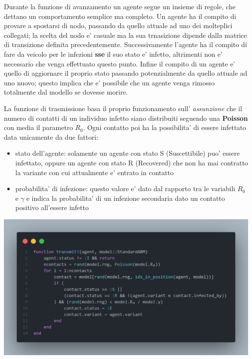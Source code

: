 Durante la funzione di avanzamento un agente segue un insieme di regole, che dettano
un comportamento semplice ma completo. Un agente ha il compito di provare a spostarsi di 
nodo, passando da quello attuale ad uno dei molteplici collegati; la scelta del nodo e' 
casuale ma la sua trnasizione dipende dalla matrice di transizione definita precedentemente.
Successivamente l'agente ha il compito di fare da veicolo per le infezioni \textbf{sse} 
il suo stato e' infetto, altrimenti non e' necessario che venga effettuato questo punto.
Infine il compito di un agente e' quello di aggiornare il proprio stato passando potenzialmente
da quello attuale ad uno nuovo; questo implica che e' possibile che un agente venga rimosso 
totalmente dal modello se dovesse morire.

La funzione di trasmissione basa il proprio funzionamento sull' \emph{assunzione} che il 
numero di contatti di un individuo infetto siano distribuiti seguendo
una \textbf{Poisson} con media il parametro $R_0$. Ogni contatto poi ha la possibilita'
di essere infettato data unicamente da due fattori:
\begin{itemize}
	\item stato dell'agente: solamente un agente con stato S (Suscettibile) puo' essere
	infettato, oppure un agente con stato R (Recovered) che non ha mai contratto la variante
	con cui attualmente e' entrato in contatto
	\item probabilita' di infezione: questo valore e' dato dal rapporto tra le variabili
	$R_0$ e $\gamma$ e indica la probabilita' di un infezione secondaria dato un contatto 
	positivo all'essere infetto
\end{itemize}

\begin{minipage}{\linewidth}
	\centering
	\includegraphics[width=\textwidth]{img/transmit_function.png}
	\label{fig:transmit_function}
\end{minipage}

